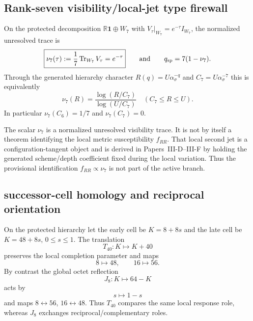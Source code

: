 \documentclass[12pt,a4paper]{article}
\begin{document}
\subsection{Rank-seven visibility/local-jet type firewall}
\label{p3c:sec:v188-n7-visibility-firewall}
\begin{corollary}
\label{p3c:cor:v188-normalized-unresolved-rank-seven-trace}
On the protected decomposition $\mathbb R\mathbf1\oplus W_7$ with
$V_\tau|_{W_7}=e^{-\tau}I_{W_7}$, the normalized unresolved trace is
\[
 \boxed{\nu_7(\tau):=\frac1{7}\operatorname{Tr}_{W_7}V_\tau=e^{-\tau}}
 \qquad\text{and}\qquad
 q_{\rm sp}=7(1-\nu_7).
\]
Through the generated hierarchy character $R(q)=U\alpha_\sigma^{-q}$ and
$C_7=U\alpha_\sigma^{-7}$ this is equivalently
\[
 \boxed{\nu_7(R)=\frac{\log(R/C_7)}{\log(U/C_7)}}
 \quad(C_7\le R\le U).
\]
In particular $\nu_7(C_6)=1/7$ and $\nu_7(C_7)=0$.
\end{corollary}
\begin{remark}
\label{p3c:rem:v188-visibility-not-curvature-hessian}
The scalar $\nu_7$ is a normalized unresolved visibility trace.  It is not
by itself a theorem identifying the local metric susceptibility $f_{RR}$.
That local second jet is a configuration-tangent object and is derived in
Papers~III-D--III-F by holding the generated scheme/depth coefficient fixed
during the local variation.  Thus the provisional identification
$f_{RR}\propto\nu_7$ is not part of the active branch.
\end{remark}




\subsection{successor-cell homology and reciprocal orientation}
\label{p3c:sec:v190-successor-cell-homology}

\begin{theorem}
\label{p3c:thm:v190-cell-translation-reflection}
On the protected hierarchy let the early cell be
$K=8+8s$ and the late cell be $K=48+8s$, $0\le s\le1$.
The translation
\[
 \boxed{T_{40}:K\mapsto K+40}
\]
preserves the local completion parameter and maps
\[
 8\mapsto48,\qquad16\mapsto56.
\]
By contrast the global octet reflection
\[
 \boxed{J_8:K\mapsto64-K}
\]
acts by
\[
 \boxed{s\mapsto1-s}
\]
and maps $8\leftrightarrow56$, $16\leftrightarrow48$.
Thus $T_{40}$ compares the same local response role, whereas $J_8$ exchanges
reciprocal/complementary roles.
\end{theorem}
\end{document}
